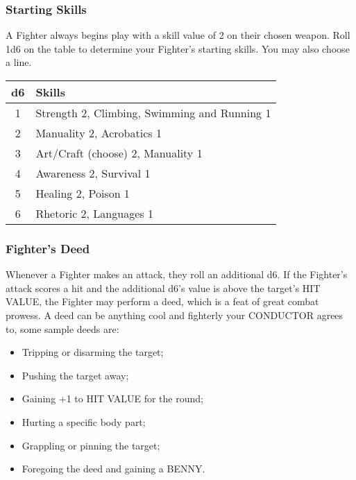 \begin{multicols}{2}
\subsubsection*{Starting Skills}
A Fighter always begins play with a skill value of 2 on their chosen weapon. Roll 1d6 on the table to determine your Fighter's starting skills. You may also choose a line.
\begin{adjustbox}{width=\columnwidth,center}
\begin{tabular}{|c|l|}
\hline
\textbf{d6} & \textbf{Skills} \\
\hline
1 & Strength 2, Climbing, Swimming and Running 1 \\
2 & Manuality 2, Acrobatics 1 \\
3 & Art/Craft (choose) 2, Manuality 1 \\
4 & Awareness 2, Survival 1 \\
5 & Healing 2, Poison 1 \\
6 & Rhetoric 2, Languages 1 \\
\hline
\end{tabular}
\end{adjustbox}

\subsubsection*{Fighter's Deed}
Whenever a Fighter makes an attack, they roll an additional d6. If the Fighter's attack scores a hit and the additional d6's value is above the target's HIT VALUE, the Fighter may perform a deed, which is a feat of great combat prowess. A deed can be anything cool and fighterly your CONDUCTOR agrees to, some sample deeds are:
\begin{itemize}
    \item Tripping or disarming the target;
    \item Pushing the target away;
    \item Gaining +1 to HIT VALUE for the round;
    \item Hurting a specific body part;
    \item Grappling or pinning the target;
    \item Foregoing the deed and gaining a BENNY.
\end{itemize}

\end{multicols}

